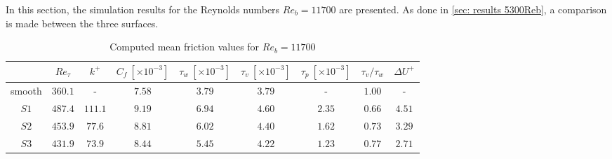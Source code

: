In this section, the simulation results for the Reynolds numbers $Re_b = 11700$ are presented.
As done in \autoref{sec: results 5300Reb}, a comparison is made between the three surfaces.
\begin{table}[h]
    \centering
    \caption[Mean friction values for $Re_b = 11700$]{Computed mean friction values for $Re_b = 11700$}
    \begin{tabular}{c c c c c c c c c}
        \toprule
                & $Re_\tau$ & $k^+$     & $C_f\ [\times10^{-3}]$ & $\tau_w\ [\times10^{-3}]$    & $\tau_v\ [\times10^{-3}]$ & $\tau_p\ [\times10^{-3}]$ & $\tau_v/\tau_w$   & $\Delta U^+$\\
        \midrule
        smooth  & $360.1$   & -         & $7.58$                & $3.79$                        & $3.79$                    & -                         & $1.00$            & - \\
        $S1$    & $487.4$   & $111.1$   & $9.19$                & $6.94$                        & $4.60$                    & $2.35$                    & $0.66$            & $4.51$\\
        $S2$    & $453.9$   & $77.6$    & $8.81$                & $6.02$                        & $4.40$                    & $1.62$                    & $0.73$            & $3.29$\\
        $S3$    & $431.9$   & $73.9$    & $8.44$                & $5.45$                        & $4.22$                    & $1.23$                    & $0.77$            & $2.71$\\
        \bottomrule
    \end{tabular}
    \label{tab: friction values 11700 Reb}
\end{table}
